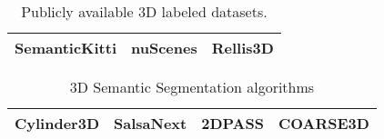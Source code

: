 \begin{table}[h!]
\begin{center}
\begin{tabular}{ |c|c|c| }
 \hline
  SemanticKitti \cite{semantickitti1,semantickitti2} & nuScenes \cite {nuscenes} & Rellis3D \cite{rellis3d} \\
 \hline
\end{tabular}
\caption{Publicly available 3D labeled datasets.}
\label{tab:datasets}
\end{center}
\end{table}

\begin{table}[h!]
\begin{center}
\begin{tabular}{ |c|c|c|c| }
 \hline
  Cylinder3D \cite{cylinder3d} & SalsaNext \cite{salsanext} & 2DPASS \cite{2dpass} & COARSE3D \cite{coarse3d} \\
 \hline
\end{tabular}
\end{center}
\caption{3D Semantic Segmentation algorithms}
\label{tab:segmenters}
\end{table}
